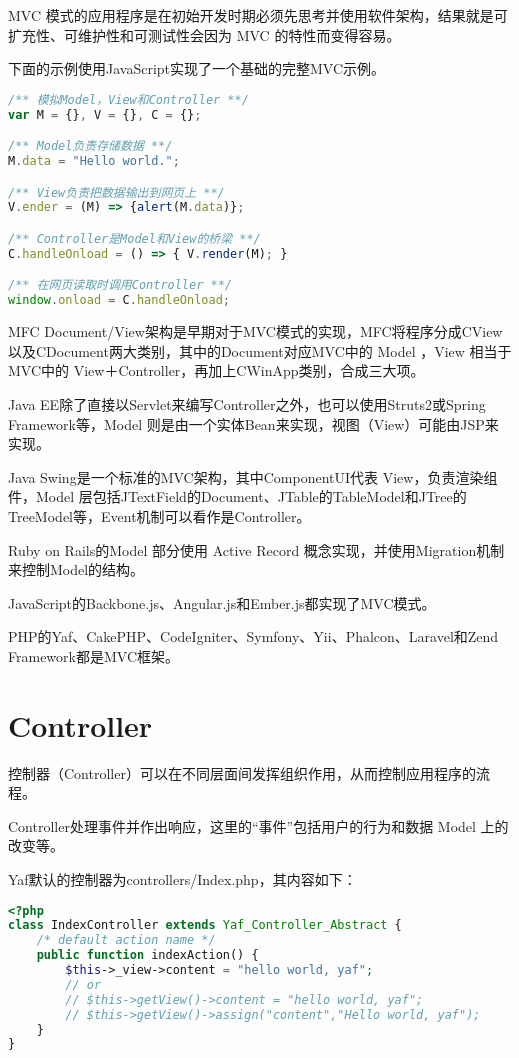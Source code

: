 MVC 模式的应用程序是在初始开发时期必须先思考并使用软件架构，结果就是可扩充性、可维护性和可测试性会因为 MVC 的特性而变得容易。

下面的示例使用JavaScript实现了一个基础的完整MVC示例。

\begin{lstlisting}[language=JavaScript]
/** 模拟Model，View和Controller **/
var M = {}, V = {}, C = {};

/** Model负责存储数据 **/
M.data = "Hello world.";

/** View负责把数据输出到网页上 **/
V.ender = (M) => {alert(M.data)};

/** Controller是Model和View的桥梁 **/
C.handleOnload = () => { V.render(M); }

/** 在网页读取时调用Controller **/
window.onload = C.handleOnload;
\end{lstlisting}

MFC Document/View架构是早期对于MVC模式的实现，MFC将程序分成CView以及CDocument两大类别，其中的Document对应MVC中的 Model ，View 相当于MVC中的 View＋Controller，再加上CWinApp类别，合成三大项。


Java EE除了直接以Servlet来编写Controller之外，也可以使用Struts2或Spring Framework等，Model 则是由一个实体Bean来实现，视图（View）可能由JSP来实现。

Java Swing是一个标准的MVC架构，其中ComponentUI代表 View，负责渲染组件，Model 层包括JTextField的Document、JTable的TableModel和JTree的TreeModel等，Event机制可以看作是Controller。

Ruby on Rails的Model 部分使用 Active Record 概念实现，并使用Migration机制来控制Model的结构。

JavaScript的Backbone.js、Angular.js和Ember.js都实现了MVC模式。

PHP的Yaf、CakePHP、CodeIgniter、Symfony、Yii、Phalcon、Laravel和Zend Framework都是MVC框架。


\section{Controller}

控制器（Controller）可以在不同层面间发挥组织作用，从而控制应用程序的流程。

Controller处理事件并作出响应，这里的“事件”包括用户的行为和数据 Model 上的改变等。



Yaf默认的控制器为controllers/Index.php，其内容如下：

\begin{lstlisting}[language=PHP]
<?php
class IndexController extends Yaf_Controller_Abstract {
    /* default action name */
    public function indexAction() {
        $this->_view->content = "hello world, yaf";
        // or
        // $this->getView()->content = "hello world, yaf";
        // $this->getView()->assign("content","Hello world, yaf");
    }
}
\end{lstlisting}

